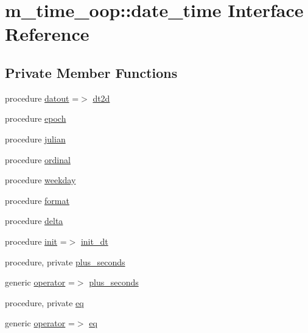 \hypertarget{structm__time__oop_1_1date__time}{}\section{m\+\_\+time\+\_\+oop\+:\+:date\+\_\+time Interface Reference}
\label{structm__time__oop_1_1date__time}
\subsection*{Private Member Functions}
\begin{DoxyCompactItemize}
\item 
procedure \hyperlink{structm__time__oop_1_1date__time_a1bb75eb969440ef0faf1f46e46de1868}{datout} =$>$ \hyperlink{namespacem__time__oop_ac68405e5566d5aec59cd1fba7145130c}{dt2d}
\item 
procedure \hyperlink{structm__time__oop_1_1date__time_a12b64ba32e07d2fa6204a62ecf6a2efb}{epoch}
\item 
procedure \hyperlink{structm__time__oop_1_1date__time_a67f3d441a50fcc5e6e55d472d66dab78}{julian}
\item 
procedure \hyperlink{structm__time__oop_1_1date__time_aa096a6bd2457e5a9370f89e5e067dc27}{ordinal}
\item 
procedure \hyperlink{structm__time__oop_1_1date__time_a921079cbc082ff2705cebdf330df3270}{weekday}
\item 
procedure \hyperlink{structm__time__oop_1_1date__time_a72439bf18aad8469effe0271bc9c64c9}{format}
\item 
procedure \hyperlink{structm__time__oop_1_1date__time_abb4e1f51226cf6adc9c1b4de56144b99}{delta}
\item 
procedure \hyperlink{structm__time__oop_1_1date__time_ad53d814cb29600d3bf038415dad3d316}{init} =$>$ \hyperlink{namespacem__time__oop_ac81ff1eb27f637a60530d3c5d442fc71}{init\+\_\+dt}
\item 
procedure, private \hyperlink{structm__time__oop_1_1date__time_a86c3ebbfa03eaab62d536e6d01ad67dd}{plus\+\_\+seconds}
\item 
generic \hyperlink{structm__time__oop_1_1date__time_adee559f2f476e1167eb7846a582154ae}{operator} =$>$ \hyperlink{structm__time__oop_1_1date__time_a86c3ebbfa03eaab62d536e6d01ad67dd}{plus\+\_\+seconds}
\item 
procedure, private \hyperlink{structm__time__oop_1_1date__time_a1215616f84b038aca246197e9ad28a48}{eq}
\item 
generic \hyperlink{structm__time__oop_1_1date__time_a33e80b5e54eec6e02c3a9dc0bc30e31a}{operator} =$>$ \hyperlink{structm__time__oop_1_1date__time_a1215616f84b038aca246197e9ad28a48}{eq}

\end{DoxyCompactItemize}
